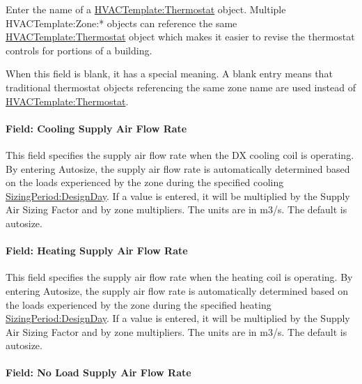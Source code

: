Enter the name of a \hyperref[hvactemplatethermostat]{HVACTemplate:Thermostat} object. Multiple HVACTemplate:Zone:* objects can reference the same \hyperref[hvactemplatethermostat]{HVACTemplate:Thermostat} object which makes it easier to revise the thermostat controls for portions of a building.

When this field is blank, it has a special meaning. A blank entry means that traditional thermostat objects referencing the same zone name are used instead of \hyperref[hvactemplatethermostat]{HVACTemplate:Thermostat}.

\paragraph{Field: Cooling Supply Air Flow Rate}\label{field-cooling-supply-air-flow-rate-1}

This field specifies the supply air flow rate when the DX cooling coil is operating. By entering Autosize, the supply air flow rate is automatically determined based on the loads experienced by the zone during the specified cooling \hyperref[sizingperioddesignday]{SizingPeriod:DesignDay}. If a value is entered, it will be multiplied by the Supply Air Sizing Factor and by zone multipliers. The units are in m3/s. The default is autosize.

\paragraph{Field: Heating Supply Air Flow Rate}\label{field-heating-supply-air-flow-rate-1}

This field specifies the supply air flow rate when the heating coil is operating. By entering Autosize, the supply air flow rate is automatically determined based on the loads experienced by the zone during the specified heating \hyperref[sizingperioddesignday]{SizingPeriod:DesignDay}. If a value is entered, it will be multiplied by the Supply Air Sizing Factor and by zone multipliers. The units are in m3/s. The default is autosize.

\paragraph{Field: No Load Supply Air Flow Rate}\label{field-no-load-supply-air-flow-rate-1}

